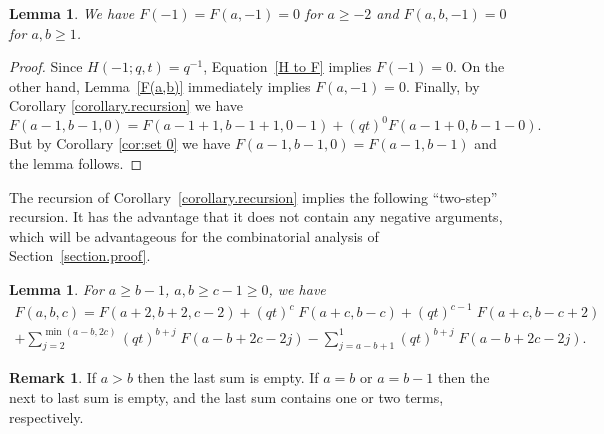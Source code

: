 \documentclass[11pt,reqno]{amsart}
\newtheorem{lemma}[theorem]{Lemma}
\theoremstyle{definition}
\newtheorem{remark}[theorem]{Remark}
\numberwithin{equation}{section}
\begin{document}
\begin{lemma}
\label{lemma.-1}
We have $F(-1)=F(a,-1)=0$ for $a\geqslant -2$ and $F(a,b,-1)=0$ for $a,b\geqslant 1$.
\end{lemma}

\begin{proof}
Since $H(-1;q,t)=q^{-1}$, Equation~\eqref{H to F} implies $F(-1)=0$.  On the other hand, Lemma~\ref{F(a,b)} immediately 
implies $F(a,-1)=0$. Finally, by Corollary \ref{corollary.recursion} we have \begin{equation*}
F(a-1,b-1,0)=F(a-1+1,b-1+1,0-1)+(qt)^0 F(a-1+0,b-1-0).
\end{equation*}
But by Corollary \ref{cor:set 0} we have $F(a-1,b-1,0)=F(a-1,b-1)$ and the lemma follows.
\end{proof}

The recursion of Corollary~\ref{corollary.recursion} implies the following ``two-step'' recursion. It has the 
advantage that it does not contain any negative arguments, which will be advantageous for the combinatorial
analysis of Section~\ref{section.proof}.

\begin{lemma}
\label{lemma.two step recurrence}
For $a\geqslant b-1$, $a,b \geqslant c-1\geqslant 0$, we have
\begin{multline*}
	F(a,b,c) = F(a+2,b+2,c-2) + (qt)^c \; F(a+c,b-c) + (qt)^{c-1} \; F(a+c,b-c+2)\\
	+\sum_{j=2}^{\min(a-b,2c)} (qt)^{b+j} \; F(a-b+2c-2j)
	-\sum_{j=a-b+1}^{1} (qt)^{b+j} \; F(a-b+2c-2j).
\end{multline*}
\end{lemma}

\begin{remark}
If $a>b$ then the last sum is empty. If $a=b$ or $a=b-1$ then the next to last sum is empty, and the last sum contains one or two terms, respectively.
\end{remark}
\end{document}
